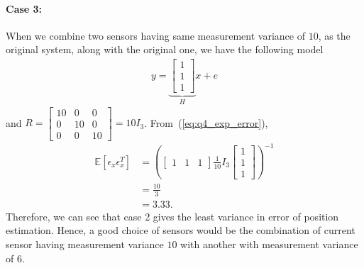 \paragraph{Case 3:} When we combine two sensors having same measurement variance of $10$, as the original system, along with the original one, we have the following model
\begin{align*}
y = \underbrace{\begin{bmatrix}1\\1\\1\end{bmatrix}}_Hx + e
\end{align*}
and $R = \begin{bmatrix}10 & 0 & 0\\0 & 10 & 0\\0 & 0 & 10\end{bmatrix} = 10 I_3$. From~(\ref{eq:q4_exp_error}),
\begin{align*}
	\mathbb{E}[\epsilon_x \epsilon_x^T] &= \left(\begin{bmatrix}1 & 1 & 1\end{bmatrix}\frac{1}{10}I_3\begin{bmatrix}1\\1\\1\end{bmatrix}\right)^{-1}\\
	&= \frac{10}{3}\\
	&= 3.33.
\end{align*}
Therefore, we can see that case 2 gives the least variance in error of position estimation. Hence, a good choice of sensors would be the combination of current sensor having measurement variance $10$ with another with measurement variance of $6$. 